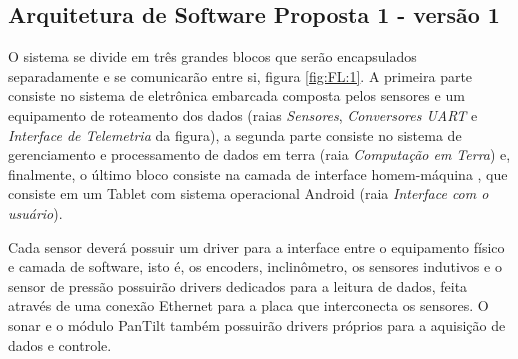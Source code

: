 \subsection{Arquitetura de Software Proposta 1 - versão 1}
O sistema se divide em três grandes blocos que serão encapsulados separadamente
e se comunicarão entre si, figura \ref{fig:FL:1}. A primeira parte consiste no
sistema de eletrônica embarcada composta pelos sensores e um equipamento de
roteamento dos dados (raias \emph{Sensores}, \emph{Conversores UART} e
\emph{Interface de Telemetria} da figura), a segunda parte consiste no sistema
de gerenciamento e processamento de dados em terra (raia \emph{Computação em
Terra}) e, finalmente, o último bloco consiste na camada de interface
homem-máquina , que consiste em um Tablet com sistema operacional Android (raia
\emph{Interface com o usuário}).


Cada sensor deverá possuir um driver para a interface entre o equipamento físico
e camada de software, isto é, os encoders, inclinômetro, os sensores indutivos e
o sensor de pressão possuirão drivers dedicados para a leitura de dados, feita
através de uma conexão Ethernet para a placa que interconecta os sensores. O
sonar e o módulo PanTilt também possuirão drivers próprios para a aquisição de
dados e controle.

